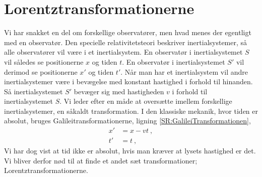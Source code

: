 \section{Lorentztransformationerne}
Vi har snakket en del om forskellige observatører, men hvad menes der egentligt med en observatør.
Den specielle relativitetsteori beskriver inertialsystemer, så alle observatører vil være i et inertialsystem.
En observatør i inertialsystemet $S$ vil således se positionerne $x$ og tiden $t$.
En observatør i inertialsystemet $S'$ vil derimod se positionerne $x'$ og tiden $t'$.
Når man har et inertialsystem vil andre inertialsystemer være i bevægelse med konstant hastighed i forhold til hinanden.
Så inertialsystemet $S'$ bevæger sig med hastigheden $v$ i forhold til inertialsystemet $S$.
Vi leder efter en måde at oversætte imellem forskellige inertialsystemer, en såkaldt transformation.
I den klassiske mekanik, hvor tiden er absolut, bruges Galileitransformationerne, ligning \eqref{SR:GalileiTransformationen}, %
\begin{subequations}
\label{eq:galilei}
\begin{align}
    x'&=x-vt \: ,\\
    t'&=t \: ,
\end{align}
\end{subequations}
Vi har dog vist at tid ikke er absolut, hvis man kræver at lysets hastighed er det.
Vi bliver derfor nød til at finde et andet sæt transformationer; Lorentztransformationerne.


